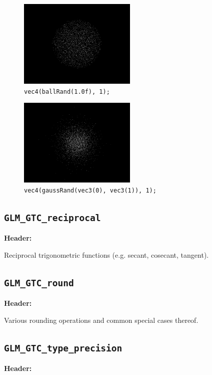 \documentclass{scrartcl}
\numberwithin{figure}{subsection}
\begin{document}
\begin{figure}[h]
  \centering
  \includegraphics[width=0.5\textwidth]{ballrand}
  \cprotect\caption{\verb|vec4(ballRand(1.0f), 1);|}
\end{figure}

\begin{figure}[h]
  \centering
  \includegraphics[width=0.5\textwidth]{gaussrand}
  \cprotect\caption{\verb|vec4(gaussRand(vec3(0), vec3(1)), 1);|}
\end{figure}

\subsection{\texttt{GLM\_GTC\_reciprocal}}
\textbf{Header:} 

Reciprocal trigonometric functions (e.g. secant, cosecant, tangent).

\subsection{\texttt{GLM\_GTC\_round}}
\textbf{Header:} 

Various rounding operations and common special cases thereof.


\subsection{\texttt{GLM\_GTC\_type\_precision}}
\textbf{Header:} 
\end{document}
